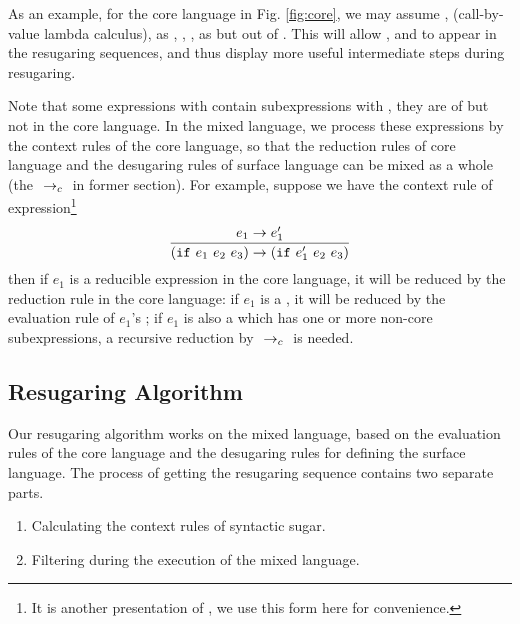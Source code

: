 


As an example, for the core language in Fig.  \ref{fig:core},
we may assume , \m{$\lambda$} (call-by-value lambda calculus),  as , , ,  as  but out of . This will allow , \m{$\lambda$} and  to appear in the resugaring sequences, and thus display more useful intermediate steps during resugaring.

Note that some expressions with  contain subexpressions with , they are of  but not in the core language. In the mixed language, we process these expressions by the context rules of the core language, so that the reduction rules of core language and the desugaring rules of surface language can be mixed as a whole (the $~\rightarrow_c~$ in former section). For example, suppose we have the context rule of  expression\footnote{It is another presentation of , we use this form here for convenience.}
\[
\infer{(\m{if}~e_1~e_2~e_3) \rightarrow (\m{if}~e_1'~e_2~e_3)}{e_1 \rightarrow e_1'}
\]
then if $e_1$ is a reducible expression in the core language, it will be reduced by the reduction rule in the core language: if $e_1$ is a , it will be reduced by the evaluation rule of $e_1$'s ; if $e_1$ is also a  which has one or more non-core subexpressions, a recursive reduction by $~\rightarrow_c~$ is needed.


\subsection{Resugaring Algorithm}

Our resugaring algorithm works on the mixed language, based on the evaluation rules of the core language and the desugaring rules for defining the surface language. The process of  getting the resugaring sequence contains two separate parts.

\begin{enumerate}
\item Calculating the context rules of syntactic sugar.
\item Filtering  during the execution of the mixed language.
\end{enumerate}

